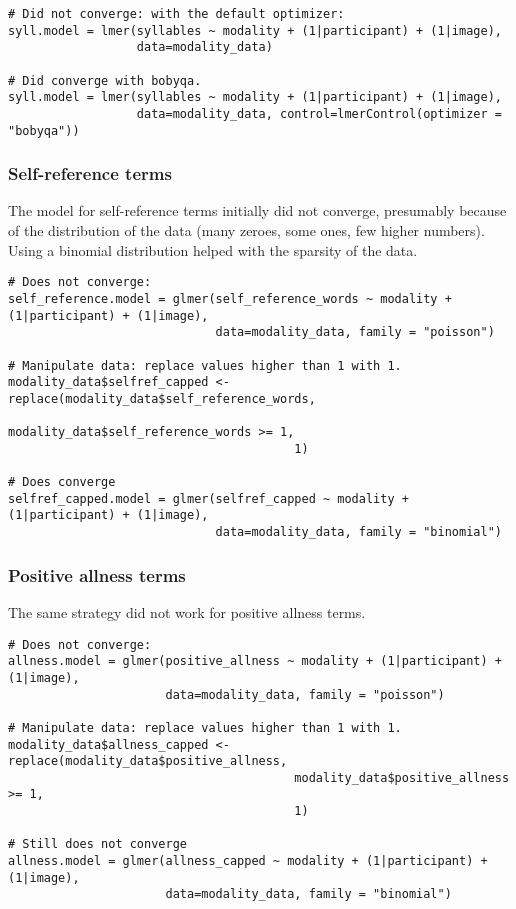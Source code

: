 \documentclass[11pt]{article}
\begin{document}
\noindent \begin{minipage}[c]{\textwidth}
\begin{lstlisting}
# Did not converge: with the default optimizer:
syll.model = lmer(syllables ~ modality + (1|participant) + (1|image), 
                  data=modality_data)

# Did converge with bobyqa.
syll.model = lmer(syllables ~ modality + (1|participant) + (1|image), 
                  data=modality_data, control=lmerControl(optimizer = "bobyqa"))
\end{lstlisting}
\end{minipage}

\subsubsection{Self-reference terms}
The model for self-reference terms initially did not converge, presumably because of the distribution of the data (many zeroes, some ones, few higher numbers). Using a binomial distribution helped with the sparsity of the data.

\noindent \begin{minipage}[c]{\textwidth}
\begin{lstlisting}
# Does not converge:
self_reference.model = glmer(self_reference_words ~ modality + (1|participant) + (1|image), 
                             data=modality_data, family = "poisson")

# Manipulate data: replace values higher than 1 with 1.
modality_data$selfref_capped <- replace(modality_data$self_reference_words, 
                                        modality_data$self_reference_words >= 1,
                                        1)

# Does converge
selfref_capped.model = glmer(selfref_capped ~ modality + (1|participant) + (1|image), 
                             data=modality_data, family = "binomial")
\end{lstlisting}
\end{minipage}

\subsubsection{Positive allness terms}
The same strategy did not work for positive allness terms.

\noindent \begin{minipage}[c]{\textwidth}
\begin{lstlisting}
# Does not converge:
allness.model = glmer(positive_allness ~ modality + (1|participant) + (1|image), 
                      data=modality_data, family = "poisson")

# Manipulate data: replace values higher than 1 with 1.
modality_data$allness_capped <- replace(modality_data$positive_allness, 
                                        modality_data$positive_allness >= 1, 
                                        1)

# Still does not converge
allness.model = glmer(allness_capped ~ modality + (1|participant) + (1|image), 
                      data=modality_data, family = "binomial")
\end{lstlisting}
\end{minipage}
\end{document}
